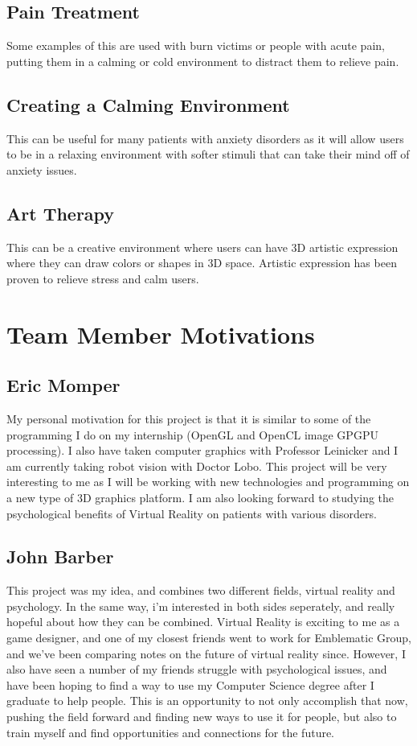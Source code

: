 \documentclass[a4paper,10pt]{article}
\begin{document}
	\subsection{Pain Treatment}
	Some examples of this are used with burn victims or people with acute pain, putting them in a calming or cold environment to distract them to relieve pain.
	\subsection{Creating a Calming Environment}
	This can be useful for many patients with anxiety disorders as it will allow users to be in a relaxing environment with softer stimuli that can take their mind off of anxiety issues. 
	\subsection{Art Therapy}
	This can be a creative environment where users can have 3D artistic expression where they can draw colors or shapes in 3D space. 
	Artistic expression has been proven to relieve stress and calm users.  
	\pagebreak
	
	
	\section{Team Member Motivations}
	\subsection{Eric Momper}
	My personal motivation for this project is that it is similar to some of the programming I do on my internship (OpenGL and OpenCL image GPGPU processing).
	I also have taken computer graphics with Professor Leinicker and I am currently taking robot vision with Doctor Lobo. This project will be very interesting to me as  
	I will be working with new technologies and programming on a new type of 3D graphics platform. I am also looking forward to studying the psychological benefits
	of Virtual Reality on patients with various disorders.  
	
	\subsection{John Barber}
	This project was my idea, and combines two different fields, virtual reality and psychology.  In the same way, i'm interested in both 
	sides seperately, and really hopeful about how they can be combined.  Virtual Reality is exciting to me as a game designer, 
	and one of my closest friends went to work for Emblematic Group, and we've been comparing notes on the future of virtual reality since.  
	However, I also have seen a number of my friends struggle with psychological issues, and have been hoping to find a way to use my Computer 
	Science degree after I graduate to help people.  This is an opportunity to not only accomplish that now, pushing the field forward and finding 
	new ways to use it for people, but also to train myself and find opportunities and connections for the future.
\end{document}
